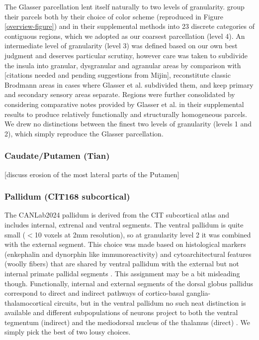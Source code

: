 \documentclass[10pt,letterpaper]{article}
\begin{document}
The Glasser parcellation lent itself naturally to two levels of granularity.  group their parcels both by their choice of color scheme (reproduced in Figure \ref{overview-figure}) and in their supplemental methods into 23 discrete categories of contiguous regions, which we adopted as our coarsest parcellation (level 4). An intermediate level of granularity (level 3) was defined based on our own best judgment and deserves particular scrutiny, however care was taken to subdivide the insula into granular, dysgranular and agranular areas by comparison with [citations needed and pending suggestions from Mijin], reconstitute classic Brodmann areas in cases where Glasser et al. subdivided them, and keep primary and secondary sensory areas separate. Regions were further consolidated by considering comparative notes provided by Glasser et al. in their supplemental results to produce relatively functionally and structurally homogeneous parcels. We drew no distinctions between the finest two levels of granularity (levels 1 and 2), which simply reproduce the Glasser parcellation.

\subsubsection{Caudate/Putamen (Tian)} [discuss erosion of the most lateral parts of the Putamen]
\\
\subsubsection{Pallidum (CIT168 subcortical)} The CANLab2024 pallidum is derived from the CIT subcortical atlas and includes internal, extrenal and ventral segments. The ventral pallidum is quite small ($<$10 voxels at 2mm resolution), so at granularity level 2 it was combined with the external segment. This choice was made based on histological markers (enkephalin and dynorphin like immunoreactivity) and cytoarchitectural features (woolly fibers) that are shared by ventral pallidum with the external but not internal primate pallidal segments . This assignment may be a bit misleading though. Functionally, internal and external segments of the dorsal globus pallidus correspond to direct and indirect pathways of cortico-basal ganglia-thalamocortical circuits, but in the ventral pallidum no such neat distinction is available and different subpopulations of neurons project to both the ventral tegmentum (indirect) and the mediodorsal nucleus of the thalamus (direct) . We simply pick the best of two lousy choices.
\\
\end{document}
